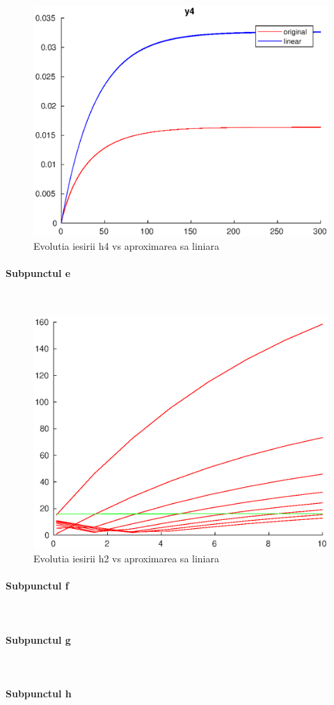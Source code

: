 \documentclass[12pt,english]{article}
\newcommand{\myparagraph}[1]{\paragraph{#1}\mbox{}\\}
\begin{document}
\begin{figure} [H]
	\includegraphics[width=1\textwidth]{d_2.eps}
	\caption{Evolutia iesirii h4 vs aproximarea sa liniara}
\end{figure}

\myparagraph {Subpunctul e}

\begin{figure} [H]
	\includegraphics[width=1\textwidth]{e_1.eps}
	\caption{Evolutia iesirii h2 vs aproximarea sa liniara}
\end{figure}

\myparagraph {Subpunctul f}
\myparagraph {Subpunctul g}
\myparagraph {Subpunctul h}
\end{document}
